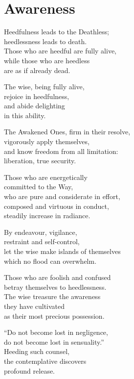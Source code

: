 
\chapter{Awareness}

Heedfulness leads to the Deathless;\\
heedlessness leads to death.\\
Those who are heedful are fully alive,\\
while those who are heedless\\
are as if already dead.

The wise, being fully alive,\\ 
rejoice in heedfulness,\\
and abide delighting\\
in this ability.


The Awakened Ones, firm in their resolve,\\
vigorously apply themselves,\\
and know freedom from all limitation:\\
liberation, true security.


Those who are energetically\\
committed to the Way,\\
who are pure and considerate in effort,\\
composed and virtuous in conduct,\\
steadily increase in radiance.


By endeavour, vigilance,\\
restraint and self-control,\\
let the wise make islands of themselves\\
which no flood can overwhelm.



Those who are foolish and confused\\
betray themselves to heedlessness.\\
The wise treasure the awareness\\
they have cultivated\\
as their most precious possession.


“Do not become lost in negligence,\\
do not become lost in sensuality.”\\
Heeding such counsel,\\
the contemplative discovers\\
profound release.

